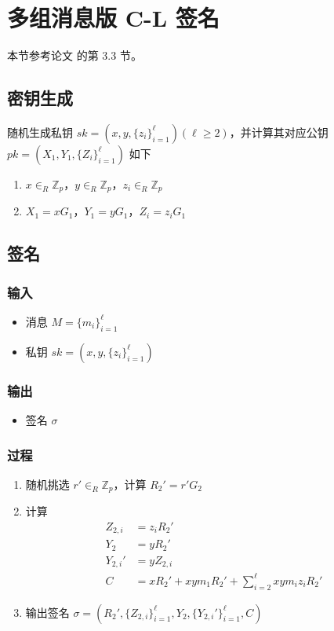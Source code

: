 \documentclass[a4paper,10pt]{article}
\newcommand{\bZ}{\mathbb{Z}}
\begin{document}
\section{多组消息版 C-L 签名}
本节参考论文 \cite{2003A} 的第 3.3 节。

\subsection{密钥生成}
随机生成私钥 \(sk=(x,y,\{z_i\}_{i=1}^{\ell}) (\ell\geq 2)\)，并计算其对应公钥 \(pk=(X_1,Y_1,\{Z_i\}_{i=1}^{\ell})\) 如下
\begin{enumerate}
  \item \(x\in_R\bZ_p\)，\(y\in_R\bZ_p\)，\(z_i\in_R\bZ_p\)
  \item \(X_1=x G_1\)，\(Y_1=y G_1\)，\(Z_i=z_i G_1\)
\end{enumerate}

\subsection{签名}
\subsubsection{输入}
\begin{itemize}
  \item 消息 \(M=\{m_i\}_{i=1}^{\ell}\)
  \item 私钥 \(sk=(x,y,\{z_i\}_{i=1}^{\ell})\)
\end{itemize}

\subsubsection{输出}
\begin{itemize}
  \item 签名 \(\sigma\)
\end{itemize}

\subsubsection{过程}
\begin{enumerate}
  \item 随机挑选 \(r'\in_R\bZ_p\)，计算 \(R_2'=r'G_2\)
  \item 计算
    \begin{align*}
      Z_{2,i} &= z_iR_2' \\
      Y_2 &= yR_2' \\
      Y_{2,i}' &= yZ_{2,i} \\
      C &= xR_2' + xym_1 R_2' + \sum_{i=2}^{\ell}xym_iz_iR_2'
    \end{align*}
  \item 输出签名 \(\sigma=(R_2',\{Z_{2,i}\}_{i=1}^{\ell},Y_2,\{Y_{2,i}'\}_{i=1}^{\ell},C)\)
\end{enumerate}
\end{document}
